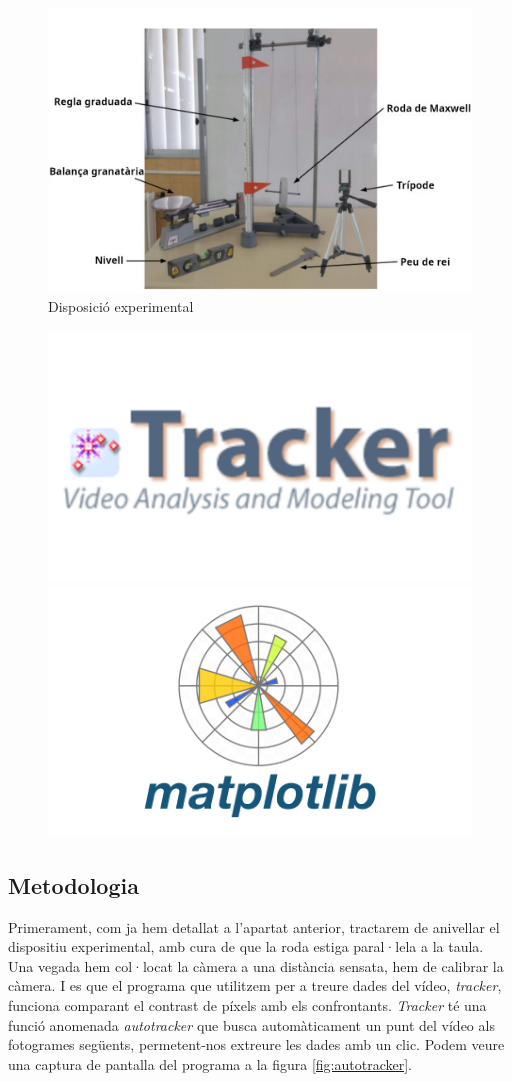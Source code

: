 \documentclass[11pt]{article}
\begin{document}
        \begin{figure}[h]
            \label{fig:disposicio}
            \vspace{-0.4cm}
            \begin{center}
                \includegraphics[width=.62\textwidth]{fotos/disposicio.png}
                \caption{Disposició experimental}
            \end{center}
        \end{figure}
        \begin{figure}[h]
            \begin{center}
                \includegraphics[width=.22\textwidth]{fotos/tracker.png}
                \includegraphics[width=.22\textwidth]{fotos/matplotlib.png}
            \end{center}
        \end{figure}
        
    \subsection{Metodologia} 
        Primerament, com ja hem detallat a l'apartat anterior, tractarem de anivellar el dispositiu experimental, amb cura de que la roda estiga paral·lela a la taula. Una vegada hem col·locat la càmera a una distància sensata, hem de calibrar la càmera. I es que el programa que utilitzem per a treure dades del vídeo, \textit{tracker}, funciona comparant el contrast de píxels amb els confrontants. \textit{Tracker} té una funció anomenada \textit{autotracker} que busca automàticament un punt del vídeo als fotogrames següents, permetent-nos extreure les dades amb un clic. Podem veure una captura de pantalla del programa a la figura \ref{fig:autotracker}.
\end{document}
